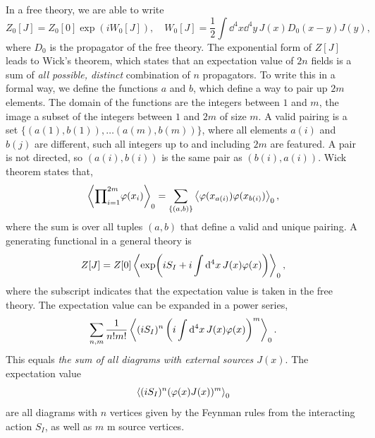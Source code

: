 In a free theory, we are able to write
\begin{equation}
    Z_0[J] = Z_0[0] \exp(i W_0[J]), \quad 
    W_0[J] = \frac{1}{2} \int \dd^4 x \dd^4 y \, J(x) D_0(x - y) J(y),
\end{equation}
where $D_0$ is the propagator of the free theory.
The exponential form of $Z[J]$ leads to Wick's theorem, which states that an expectation value of $2n$ fields is a sum of \emph{all possible, distinct} combination of $n$ propagators.
To write this in a formal way, we define the functions $a$ and $b$, which define a way to pair up $2m$ elements.
The domain of the functions are the integers between $1$ and $m$, the image a subset of the integers between $1$ and $2m$ of size $m$.
A valid pairing is a set $\{(a(1), b(1)), \dots (a(m), b(m))\}$, where all elements $a(i)$ and $b(j)$ are different, such all integers up to and including $2m$ are featured.
A pair is not directed, so $(a(i), b(i))$ is the same pair as $(b(i), a(i))$.
Wick theorem states that,
\begin{equation}
    \ex{{\prod}_{i=1}^{2m} \varphi(x_i)  }_0
    = \sum_{\{(a, b)\}} \ex{\varphi(x_{a(i)}) \varphi(x_{b(i)})}_0,
\end{equation}
where the sum is over all tuples $(a, b)$ that define a valid and unique pairing.
A generating functional in a general theory is 
\begin{equation}
    Z[J] 
    = Z[0] \ex{\exp(iS_I + i\int \dd^4 x \, J(x) \varphi(x))}_0,
\end{equation}
where the subscript indicates that the expectation value is taken in the free theory.
The expectation value can be expanded in a power series, 
\begin{equation}
    \sum_{n, m} \frac{1}{n! m!} \ex{(iS_I)^n \left(i\int \dd^4 x \, J(x) \varphi(x)\right)^m}_0.
\end{equation}
This equals \emph{the sum of all diagrams with external sources $J(x)$}.
The expectation value
\begin{equation}
    \ex{(iS_I)^n (\varphi(x)J(x))^m}_0
\end{equation}
are all diagrams with $n$ vertices given by the Feynman rules from the interacting action $S_I$, as well as $m$ m source vertices.

